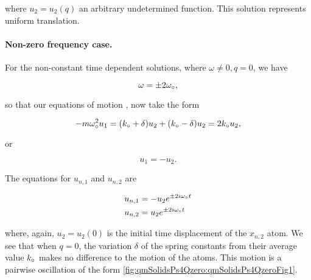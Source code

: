 {where \(u_2 = u_2(q)\) an arbitrary undetermined function.  This solution represents uniform translation.

%
%
%
%

\paragraph{Non-zero frequency case.}

For the non-constant time dependent solutions, where \(\omega \ne 0, q = 0\), we have

\begin{dmath}\label{eqn:condensedMatterProblemSet4Problem2:560}
\omega = \pm 2 \omega_\nought,
\end{dmath}

so that our equations of motion , now take the form

\begin{dmath}\label{eqn:condensedMatterProblemSet4Problem2:640}
-m \omega_\nought^2 u_1
=
(k_\nought + \delta)
u_2
+ (k_\nought - \delta)
u_2
=
2 k_\nought
u_2,
\end{dmath}

or

\begin{dmath}\label{eqn:condensedMatterProblemSet4Problem2:660}
u_1 = -u_2.
\end{dmath}

The equations for \(u_{n, 1}\) and \(u_{n, 2}\) are

\begin{dmath}\label{eqn:condensedMatterProblemSet4Problem2:600}
\begin{aligned}
u_{n, 1} &= -u_2 e^{ \pm 2 i \omega_\nought t } \\
u_{n, 2} &= u_2 e^{ \pm 2 i \omega_\nought t }
\end{aligned}
\end{dmath}

where, again, \(u_2 = u_2(0)\) is the initial time displacement of the \(x_{n, 2}\) atom.  We see that when \(q = 0\), the variation \(\delta\) of the spring constants from their average value \(k_\circ\) makes no difference to the motion of the atoms.  This motion is a pairwise oscillation of the form \cref{fig:qmSolidsPs4Qzero:qmSolidsPs4QzeroFig1}.

}
